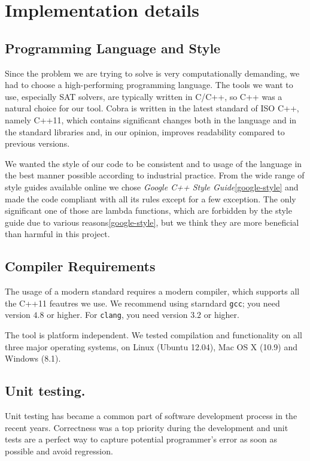 \section{Implementation details}

\subsection{Programming Language and Style}

Since the problem we are trying to solve is very computationally demanding,
  we had to choose a high-performing programming language.
The tools we want to use, especially SAT solvers, are typically written in C/C++,
  so C++ was a natural choice for our tool.
Cobra is written in the latest standard of ISO C++, namely C++11, which
  contains significant changes both in the language and in the standard libraries
  and, in our opinion, improves readability compared to previous versions.

We wanted the style of our code to be consistent and to usage of the language in the best
 manner possible according to industrial practice.
From the wide range of style guides available online
 we chose \emph{Google C++ Style Guide}\ref{google-style} and made
 the code compliant with all its rules except for a few exception.
The only significant one of those are lambda functions, which are forbidden
 by the style guide due to various reasons\ref{google-style},
 but we think they are more beneficial than harmful in this project.

\subsection{Compiler Requirements}
The usage of a modern standard requires a modern compiler,
  which supports all the C++11 feautres we use.
We recommend using starndard \texttt{gcc}; you need version $4.8$ or higher.
For \texttt{clang}, you need version $3.2$ or higher.

The tool is platform independent.
  We tested compilation and functionality on
  all three major operating systems, on Linux (Ubuntu 12.04),
  Mac OS X (10.9) and Windows (8.1).

\subsection{Unit testing.}
Unit testing has became a common part of software development process
  in the recent years.
Correctness was a top priority during the development and
  unit tests are a perfect way to capture potential programmer's error
  as soon as possible and avoid regression.

